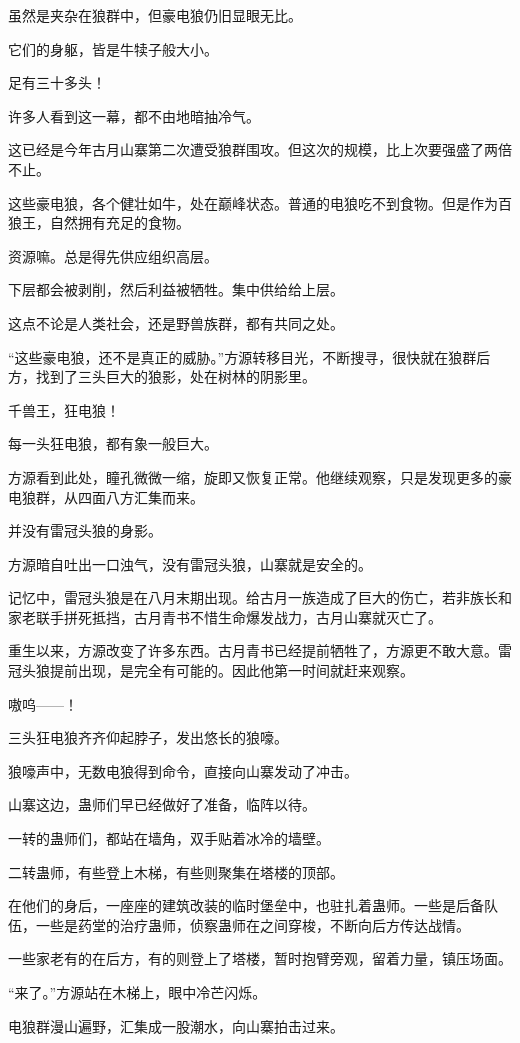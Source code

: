 \begin{this_body}
虽然是夹杂在狼群中，但豪电狼仍旧显眼无比。

它们的身躯，皆是牛犊子般大小。

足有三十多头！

许多人看到这一幕，都不由地暗抽冷气。

这已经是今年古月山寨第二次遭受狼群围攻。但这次的规模，比上次要强盛了两倍不止。

这些豪电狼，各个健壮如牛，处在巅峰状态。普通的电狼吃不到食物。但是作为百狼王，自然拥有充足的食物。

资源嘛。总是得先供应组织高层。

下层都会被剥削，然后利益被牺牲。集中供给给上层。

这点不论是人类社会，还是野兽族群，都有共同之处。

“这些豪电狼，还不是真正的威胁。”方源转移目光，不断搜寻，很快就在狼群后方，找到了三头巨大的狼影，处在树林的阴影里。

千兽王，狂电狼！

每一头狂电狼，都有象一般巨大。

方源看到此处，瞳孔微微一缩，旋即又恢复正常。他继续观察，只是发现更多的豪电狼群，从四面八方汇集而来。

并没有雷冠头狼的身影。

方源暗自吐出一口浊气，没有雷冠头狼，山寨就是安全的。

记忆中，雷冠头狼是在八月末期出现。给古月一族造成了巨大的伤亡，若非族长和家老联手拼死抵挡，古月青书不惜生命爆发战力，古月山寨就灭亡了。

重生以来，方源改变了许多东西。古月青书已经提前牺牲了，方源更不敢大意。雷冠头狼提前出现，是完全有可能的。因此他第一时间就赶来观察。

嗷呜——！

三头狂电狼齐齐仰起脖子，发出悠长的狼嚎。

狼嚎声中，无数电狼得到命令，直接向山寨发动了冲击。

山寨这边，蛊师们早已经做好了准备，临阵以待。

一转的蛊师们，都站在墙角，双手贴着冰冷的墙壁。

二转蛊师，有些登上木梯，有些则聚集在塔楼的顶部。

在他们的身后，一座座的建筑改装的临时堡垒中，也驻扎着蛊师。一些是后备队伍，一些是药堂的治疗蛊师，侦察蛊师在之间穿梭，不断向后方传达战情。

一些家老有的在后方，有的则登上了塔楼，暂时抱臂旁观，留着力量，镇压场面。

“来了。”方源站在木梯上，眼中冷芒闪烁。

电狼群漫山遍野，汇集成一股潮水，向山寨拍击过来。


\end{this_body}
